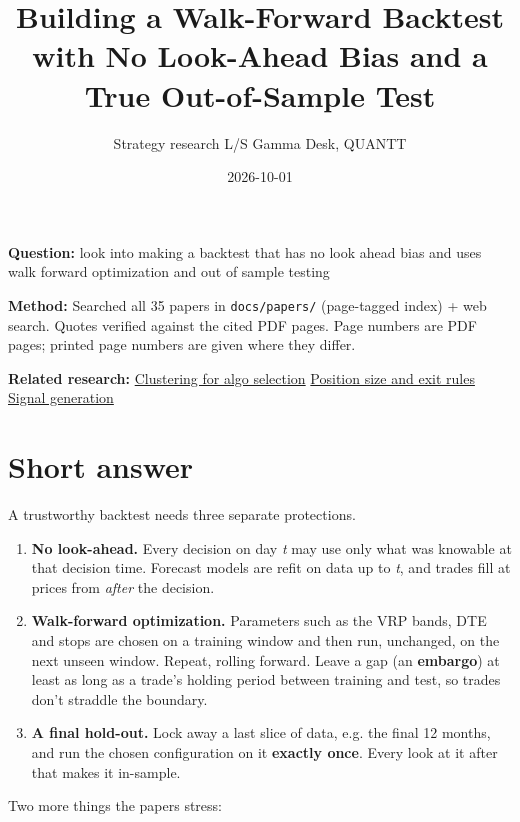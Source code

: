 \documentclass{article}
\title{Building a Walk-Forward Backtest with No Look-Ahead Bias and a True Out-of-Sample Test}
\author{Strategy research \textperiodcentered{} L/S Gamma Desk, QUANTT}
\date{2026-10-01}
\begin{document}
\maketitle

\textbf{Question:} look into making a backtest that has no look ahead bias and uses walk forward optimization and out of sample testing

\textbf{Method:} Searched all 35 papers in \texttt{docs/\allowbreak{}papers/\allowbreak{}} (page-tagged index) + web search. Quotes verified against the cited PDF pages. Page numbers are PDF pages; printed page numbers are given where they differ.

\textbf{Related research:} \href{2026-10-01-clustering-k-means-for-algo-selection.pdf}{Clustering for algo selection} \textperiodcentered{} \href{2026-10-01-position-size-and-exit-rules.pdf}{Position size and exit rules} \textperiodcentered{} \href{2026-09-29-signal-generation-for-market-state.pdf}{Signal generation}

\section{Short answer}

A trustworthy backtest needs three separate protections.

\begin{enumerate}

\item \textbf{No look-ahead.} Every decision on day \emph{t} may use only what was knowable at that decision time. Forecast models are refit on data up to \emph{t}, and trades fill at prices from \emph{after} the decision.

\item \textbf{Walk-forward optimization.} Parameters such as the VRP bands, DTE and stops are chosen on a training window and then run, unchanged, on the next unseen window. Repeat, rolling forward. Leave a gap (an \textbf{embargo}) at least as long as a trade's holding period between training and test, so trades don't straddle the boundary.

\item \textbf{A final hold-out.} Lock away a last slice of data, e.g. the final 12 months, and run the chosen configuration on it \textbf{exactly once}. Every look at it after that makes it in-sample.

\end{enumerate}

Two more things the papers stress:
\end{document}
